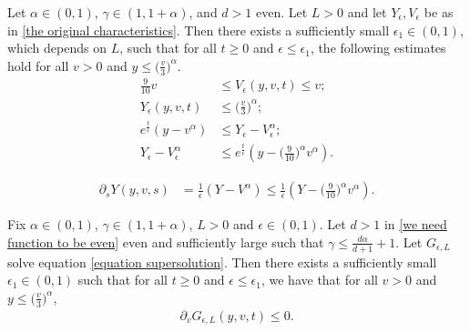 \documentclass[10pt,a4paper]{amsart}
\begin{document}
   \begin{prop}\label{proposition about inequalities}
Let $\alpha\in(0,1)$, $\gamma\in(1,1+\alpha)$, and $d>1$ even. Let $L>0$ and let $Y_{\epsilon}, V_{\epsilon}$ be as in \eqref{the original characteristics}. Then there exists a sufficiently small $\epsilon_{1}\in(0,1)$, which depends on $L$, such that for all $t \geq 0$ and $\epsilon\leq \epsilon_{1}$, the following estimates hold for all $v>0$ and $y\leq \big(\frac{v}{3}\big)^{\alpha}$.
      \begin{align}
        \frac{9}{10} v &\leq  V_{\epsilon}(y,v,t)\leq v;\label{ineq}\\
     Y_{\epsilon}(y,v,t)&\leq \big(\frac{v}{3}\big)^{\alpha};\label{ineq part two}\\
e^{\frac{t}{\epsilon}} (y-v^{\alpha}) & \leq   Y_{\epsilon}-V_{\epsilon}^{\alpha};\label{ineqq}\\
 Y_{\epsilon}-V_{\epsilon}^{\alpha}&\leq e^{\frac{t}{\epsilon}} (y-\Big(\frac{9}{10}\Big)^{\alpha}v^{\alpha}).\label{ineq 3}
      \end{align}
  \end{prop}

  \begin{align}\label{iterative argument characteristics}
  \partial_{s}{Y}(y,v,s)&=\frac{1}{\epsilon}(Y-{V}^{\alpha})\leq \frac{1}{\epsilon}(Y-\Big(\frac{9}{10}\Big)^{\alpha}{v}^{\alpha}).
  \end{align}

 \begin{prop}\label{der v g negative}
Fix $\alpha\in(0,1)$, $\gamma\in(1,1+\alpha)$, $L>0$ and $\epsilon\in(0,1)$. Let $d>1$ in \eqref{we need function to be even} even and sufficiently large such that $\gamma\leq \frac{d\alpha}{d+1}+1$. Let $G_{\epsilon,L}$ solve equation \eqref{equation supersolution}. Then there exists a sufficiently small $\epsilon_{1}\in(0,1)$ such that for all $t \geq 0$ and $\epsilon\leq \epsilon_{1}$, we have that for all $v>0$ and $y\leq \big(\frac{v}{3}\big)^{\alpha}$,
\begin{align*}
    \partial_{v}G_{\epsilon,L}(y,v,t)\leq 0.
\end{align*}
 \end{prop}
\end{document}
